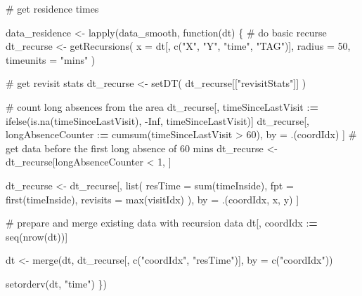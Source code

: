 \documentclass[]{scrreprt}
\newenvironment{Shaded}{}{}
\newcommand{\CommentTok}[1]{\textcolor[rgb]{0.00,0.50,0.00}{#1}}
\newcommand{\ControlFlowTok}[1]{\textcolor[rgb]{0.00,0.00,1.00}{#1}}
\newcommand{\DataTypeTok}[1]{#1}
\newcommand{\DecValTok}[1]{#1}
\newcommand{\ErrorTok}[1]{\textcolor[rgb]{1.00,0.00,0.00}{\textbf{#1}}}
\newcommand{\KeywordTok}[1]{\textcolor[rgb]{0.00,0.00,1.00}{#1}}
\newcommand{\NormalTok}[1]{#1}
\newcommand{\OperatorTok}[1]{#1}
\newcommand{\OtherTok}[1]{\textcolor[rgb]{1.00,0.25,0.00}{#1}}
\newcommand{\StringTok}[1]{\textcolor[rgb]{0.00,0.50,0.50}{#1}}
\begin{document}
\begin{Shaded}
\begin{Highlighting}[]
\CommentTok{# get residence times}

\NormalTok{data_residence <-}\StringTok{ }\KeywordTok{lapply}\NormalTok{(data_smooth, }\ControlFlowTok{function}\NormalTok{(dt) \{}
  \CommentTok{# do basic recurse}
\NormalTok{  dt_recurse <-}\StringTok{ }\KeywordTok{getRecursions}\NormalTok{(}
    \DataTypeTok{x =}\NormalTok{ dt[, }\KeywordTok{c}\NormalTok{(}\StringTok{"X"}\NormalTok{, }\StringTok{"Y"}\NormalTok{, }\StringTok{"time"}\NormalTok{, }\StringTok{"TAG"}\NormalTok{)],}
    \DataTypeTok{radius =} \DecValTok{50}\NormalTok{,}
    \DataTypeTok{timeunits =} \StringTok{"mins"}
\NormalTok{  )}
  
  \CommentTok{# get revisit stats}
\NormalTok{  dt_recurse <-}\StringTok{ }\KeywordTok{setDT}\NormalTok{(}
\NormalTok{    dt_recurse[[}\StringTok{"revisitStats"}\NormalTok{]]}
\NormalTok{  )}
  
  \CommentTok{# count long absences from the area}
\NormalTok{  dt_recurse[, timeSinceLastVisit }\OperatorTok{:}\ErrorTok{=}
\StringTok{          }\KeywordTok{ifelse}\NormalTok{(}\KeywordTok{is.na}\NormalTok{(timeSinceLastVisit), }\OperatorTok{-}\OtherTok{Inf}\NormalTok{, timeSinceLastVisit)]}
\NormalTok{  dt_recurse[, longAbsenceCounter }\OperatorTok{:}\ErrorTok{=}\StringTok{ }\KeywordTok{cumsum}\NormalTok{(timeSinceLastVisit }\OperatorTok{>}\StringTok{ }\DecValTok{60}\NormalTok{),}
\NormalTok{             by =}\StringTok{ }\NormalTok{.(coordIdx)}
\NormalTok{             ]}
  \CommentTok{# get data before the first long absence of 60 mins}
\NormalTok{  dt_recurse <-}\StringTok{ }\NormalTok{dt_recurse[longAbsenceCounter }\OperatorTok{<}\StringTok{ }\DecValTok{1}\NormalTok{, ]}
  
\NormalTok{  dt_recurse <-}\StringTok{ }\NormalTok{dt_recurse[, }\KeywordTok{list}\NormalTok{(}
    \DataTypeTok{resTime =} \KeywordTok{sum}\NormalTok{(timeInside),}
    \DataTypeTok{fpt =} \KeywordTok{first}\NormalTok{(timeInside),}
    \DataTypeTok{revisits =} \KeywordTok{max}\NormalTok{(visitIdx)}
\NormalTok{  ),}
\NormalTok{  by =}\StringTok{ }\NormalTok{.(coordIdx, x, y)}
\NormalTok{  ]}
  
  \CommentTok{# prepare and merge existing data with recursion data}
\NormalTok{  dt[, coordIdx }\OperatorTok{:}\ErrorTok{=}\StringTok{ }\KeywordTok{seq}\NormalTok{(}\KeywordTok{nrow}\NormalTok{(dt))]}
  
\NormalTok{  dt <-}\StringTok{ }\KeywordTok{merge}\NormalTok{(dt, }
\NormalTok{              dt_recurse[, }\KeywordTok{c}\NormalTok{(}\StringTok{"coordIdx"}\NormalTok{, }\StringTok{"resTime"}\NormalTok{)], }
              \DataTypeTok{by =} \KeywordTok{c}\NormalTok{(}\StringTok{"coordIdx"}\NormalTok{))}
  
  \KeywordTok{setorderv}\NormalTok{(dt, }\StringTok{"time"}\NormalTok{)}
\NormalTok{\})}
\end{Highlighting}
\end{Shaded}
\end{document}
